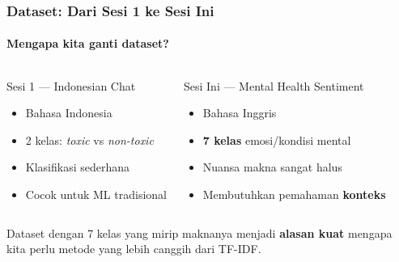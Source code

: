 \documentclass[t,aspectratio=169,xcolor=dvipsnames]{beamer}
\begin{document}
\begin{frame}
    \frametitle{Dataset: Dari Sesi 1 ke Sesi Ini}
    \framesubtitle{Mengapa kita ganti dataset?}
    \small
    \begin{columns}[T]
        \begin{block}{Sesi 1 — Indonesian Chat}
            \begin{itemize}
                \item Bahasa Indonesia
                \item 2 kelas: \textit{toxic} vs \textit{non-toxic}
                \item Klasifikasi sederhana
                \item Cocok untuk ML tradisional
            \end{itemize}
        \end{block}

        \begin{exampleblock}{Sesi Ini — Mental Health Sentiment}
            \begin{itemize}
                \item Bahasa Inggris
                \item \textbf{7 kelas} emosi/kondisi mental
                \item Nuansa makna sangat halus
                \item Membutuhkan pemahaman \textbf{konteks}
            \end{itemize}
        \end{exampleblock}
    \end{columns}

    \vspace{0.6em}
    Dataset dengan 7 kelas yang mirip maknanya menjadi \textbf{alasan kuat} mengapa kita perlu metode yang lebih canggih dari TF-IDF.
\end{frame}
\end{document}
